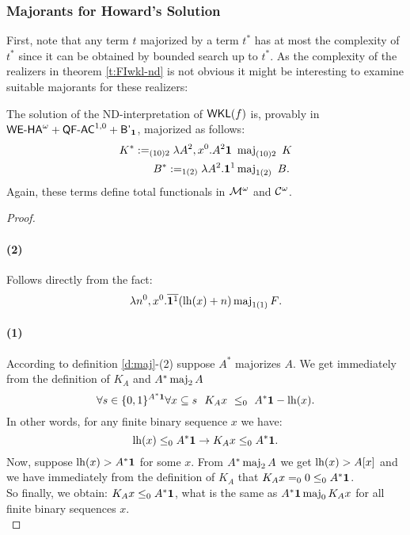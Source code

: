 \subsubsection*{Majorants for Howard's Solution} \label{ss:majFI}
First, note that any term $t$ majorized by a term $t^*$ has at most the complexity
of $t^*$ since it can be obtained by bounded search up to $t^*$. As the complexity
of the realizers in theorem \ref{t:FIwkl-nd} is not obvious it might be interesting
to examine suitable majorants for these realizers:%
\begin{thm}
The solution of the ND-interpretation 
of $\textsf{\upshape WKL}(f)$ is, provably in ${\textsf{\upshape WE-HA}}^{\omega}+\textsf{\upshape QF}\textsf{\upshape -}\textsf{\upshape AC}^{1,0}+\textsf{\upshape B'}_{\mathbf1}$, majorized as follows:
\setcounter{equation}{0}
\begin{align}
K^*:=_{(10)2}\lambda A^2,x^0.A^2\mathbf1\ &\operatorname{maj}_{(10)2}\ K\\
B^*:=_{1(2)}\lambda A^2. \mathbf1^1 &\operatorname{maj}_{1(2)}\ B
\text{.}
\end{align}
Again, these terms define total functionals in $\mathcal{M} ^\omega$ and $\mathcal{C} ^\omega$.
\end{thm}
\begin{proof}
\paragraph{(2)}
Follows directly from the fact:
\[
\lambda n^0,x^0.\overline{\mathbf1^1}(\operatorname{lh}(x)+n) \operatorname{maj}_{1(1)} F\text{.}
\]
\paragraph{(1)}
According to definition \ref{d:maj}-(2) suppose $A^*$ majorizes $A$. 
We get immediately from the definition of $K_A$ and
$A^* \operatorname{maj}_2 A$
\[
\forall s\in\{0,1\}^{A^*\mathbf1}\forall x\subseteq s\ \ K_Ax\ \leq_0\ A^*\mathbf1-\operatorname{lh}(x)\text{.}
\]
In other words, for any finite binary sequence $x$ we have:
\[
\operatorname{lh}(x)\leq_0A^*\mathbf1 \rightarrow K_Ax\leq_0A^*\mathbf1\text{.}
\]
Now, suppose $\operatorname{lh}(x)>A^*\mathbf1$ for some $x$. 
From $A^* \operatorname{maj}_2 A$ we get $\operatorname{lh}(x)>A[x]$ 
and we have immediately from the definition of $K_A$ that $K_Ax=_00\leq_0A^*\mathbf1$.\\
So finally, we obtain: $K_Ax\leq_0A^*\mathbf1$, what is the same as
$A^*\mathbf1 \operatorname{maj}_0 K_Ax$ for all finite binary sequences $x$.\\
\end{proof}\\
